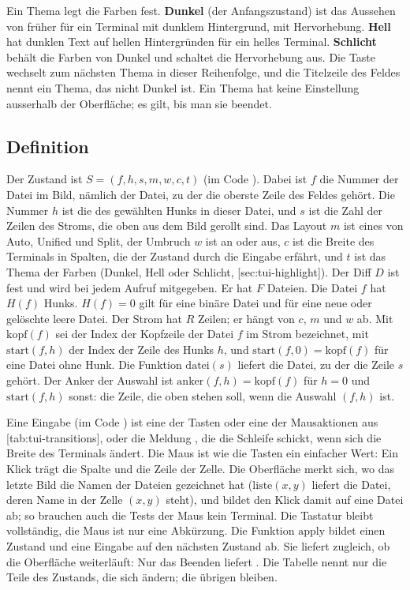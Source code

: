 Ein Thema legt die Farben fest. {\bf Dunkel} (der Anfangszustand) ist das Aussehen von früher für
ein Terminal mit dunklem Hintergrund, mit Hervorhebung. {\bf Hell} hat dunklen Text auf hellen
Hintergründen für ein helles Terminal. {\bf Schlicht} behält die Farben von Dunkel und schaltet
die Hervorhebung aus. Die Taste  wechselt zum nächsten Thema in dieser Reihenfolge, und
die Titelzeile des Feldes nennt ein Thema, das nicht Dunkel ist. Ein Thema hat keine
Einstellung ausserhalb der Oberfläche; es gilt, bis man sie beendet.

\subsection{Definition}

Der Zustand ist $S = (f, h, s, m, w, c, t)$ (im Code ). Dabei ist $f$ die Nummer der
Datei im Bild, nämlich der Datei, zu der die oberste Zeile des Feldes gehört. Die Nummer $h$ ist
die des gewählten Hunks in dieser Datei, und $s$ ist die Zahl der Zeilen des Stroms, die oben aus
dem Bild gerollt sind. Das Layout $m$ ist eines von Auto, Unified und Split, der Umbruch
$w$ ist an oder aus, $c$ ist die Breite des Terminals in Spalten, die der Zustand durch die
Eingabe  erfährt, und $t$ ist das Thema der Farben (Dunkel, Hell oder Schlicht,
[sec:tui-highlight]). Der Diff $D$ ist fest und wird bei jedem Aufruf mitgegeben.
Er hat $F$ Dateien. Die Datei $f$ hat $H(f)$ Hunks. $H(f) = 0$ gilt für eine binäre Datei und
für eine neue oder gelöschte leere Datei. Der Strom hat $R$ Zeilen; er hängt von $c$, $m$
und $w$ ab. Mit $\mathrm{kopf}(f)$ sei der Index der Kopfzeile der Datei $f$ im Strom bezeichnet,
mit $\mathrm{start}(f, h)$ der Index der Zeile  des Hunks $h$, und
$\mathrm{start}(f, 0) = \mathrm{kopf}(f)$ für eine Datei ohne Hunk. Die Funktion
$\mathrm{datei}(s)$ liefert die Datei, zu der die Zeile $s$ gehört. Der Anker der Auswahl ist
$\mathrm{anker}(f, h) = \mathrm{kopf}(f)$ für $h = 0$ und $\mathrm{start}(f, h)$ sonst: die Zeile,
die oben stehen soll, wenn die Auswahl $(f, h)$ ist.

Eine Eingabe (im Code ) ist eine der Tasten oder eine der Mausaktionen aus
[tab:tui-transitions], oder die Meldung , die die Schleife schickt,
wenn sich die Breite des Terminals ändert.
Die Maus ist wie die Tasten ein einfacher Wert: Ein Klick trägt die Spalte und die Zeile der
Zelle. Die Oberfläche merkt sich, wo das letzte Bild die Namen der Dateien gezeichnet hat
($\mathrm{liste}(x, y)$ liefert die Datei, deren Name in der Zelle $(x, y)$ steht), und bildet
den Klick damit auf eine Datei ab; so brauchen auch die Tests der Maus kein Terminal.
Die Tastatur bleibt vollständig, die Maus ist nur eine Abkürzung.
Die Funktion $\mathrm{apply}$ bildet einen Zustand und eine Eingabe auf den nächsten
Zustand ab.
Sie liefert zugleich, ob die Oberfläche weiterläuft: Nur das Beenden liefert .
Die Tabelle nennt nur die Teile des Zustands, die sich ändern; die übrigen bleiben.

